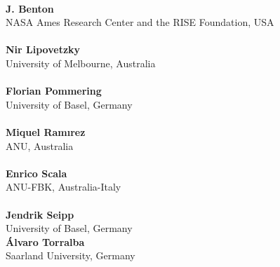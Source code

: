 {\Large
\ \\ 
{\bf J. Benton} \\ 
NASA Ames Research Center and the RISE Foundation, USA\\
\ \\
{\bf Nir Lipovetzky} \\
University of Melbourne, Australia\\
\ \\
{\bf Florian Pommering}\\
University of Basel, Germany\\
\ \\
{\bf Miquel Ramırez}\\
ANU, Australia\\
\ \\
{\bf Enrico Scala}\\
ANU-FBK, Australia-Italy\\
\ \\
{\bf Jendrik Seipp}\\
University of Basel, Germany
\ \\
{\bf {\'A}lvaro Torralba}\\
Saarland University, Germany
}


